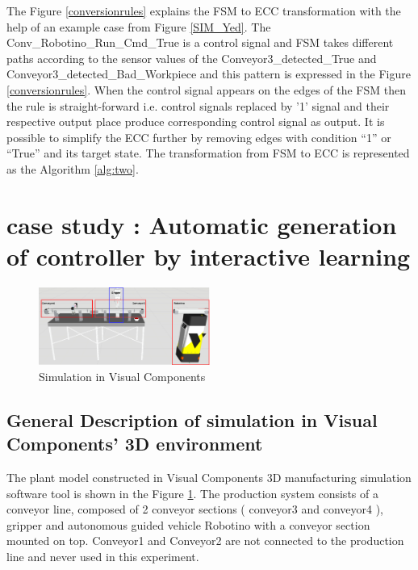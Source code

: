 \documentclass[conference]{IEEEtran}
\begin{document}
The Figure \ref{conversionrules} explains the FSM to ECC transformation with the help of an example case from Figure \ref{SIM_Yed}.  The Conv\_Robotino\_Run\_Cmd\_True is a control signal and FSM takes different paths according to the sensor values of the Conveyor3\_detected\_True and Conveyor3\_detected\_Bad\_Workpiece and this pattern is expressed in the Figure \ref{conversionrules}. When the control signal appears on the edges of the FSM  then the rule is straight-forward i.e. control signals replaced by '1' signal and their respective output place produce corresponding control signal as output. It is possible to simplify the ECC further  by removing edges with condition  “1” or “True” and its target state. The transformation from FSM to ECC is represented as the Algorithm \ref{alg:two}.



\section{case study : Automatic generation of controller by interactive learning}
\label{sec:casestudy}

\begin{figure}[!t]
	\centering
	\includegraphics[width=0.5\textwidth]{images/simulation.png}
	\caption{Simulation in Visual Components}
	\label{SIM_UI}
\end{figure}

\subsection{General Description of simulation in Visual Components' 3D environment}

The plant model constructed in Visual Components 3D manufacturing simulation software tool is shown in the Figure \ref{SIM_UI}.	The production system consists of a conveyor line, composed of 2 conveyor sections ( conveyor3 and conveyor4 ), gripper and autonomous guided vehicle Robotino with a conveyor section mounted on top.  Conveyor1 and Conveyor2 are not connected to the production line and never used in this experiment.
\end{document}
